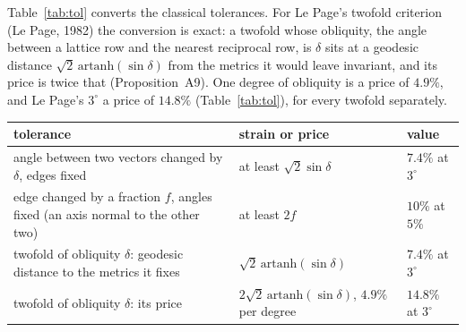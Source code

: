 Table~\ref{tab:tol} converts the classical tolerances. For Le Page's twofold criterion (Le Page, 1982) the conversion is exact: a twofold whose obliquity, the angle between a lattice row and the nearest reciprocal row, is $\delta$ sits at a geodesic distance $\sqrt2\,\mathrm{artanh}(\sin\delta)$ from the metrics it would leave invariant, and its price is twice that (Proposition~A9). One degree of obliquity is a price of $4.9\%$, and Le Page's $3^\circ$ a price of $14.8\%$ (Table~\ref{tab:tol}), for every twofold separately.

\begin{widetable}
\caption{Classical tolerances as strains and prices. The first two rows give, to first order, the smallest strain of such a change, reached for an orthogonal pair (first row) or an axis normal to the other two (second row); the last two rows are exact for a twofold along a lattice row, in every cell (Proposition~A9).}
\label{tab:tol}
\begin{footnotesize}
\begin{tabular}{>{\raggedright\arraybackslash}p{8.0cm}>{\raggedright\arraybackslash}p{6.5cm}l}
\toprule
tolerance & strain or price & value \\
\midrule
angle between two vectors changed by $\delta$, edges fixed & at least $\sqrt2\sin\delta$ & $7.4\%$ at $3^\circ$ \\
edge changed by a fraction $f$, angles fixed (an axis normal to the other two) & at least $2f$ & $10\%$ at $5\%$ \\
twofold of obliquity $\delta$: geodesic distance to the metrics it fixes & $\sqrt2\,\mathrm{artanh}(\sin\delta)$ & $7.4\%$ at $3^\circ$ \\
twofold of obliquity $\delta$: its price & $2\sqrt2\,\mathrm{artanh}(\sin\delta)$, $4.9\%$ per degree & $14.8\%$ at $3^\circ$ \\
\bottomrule
\end{tabular}
\end{footnotesize}
\end{widetable}

